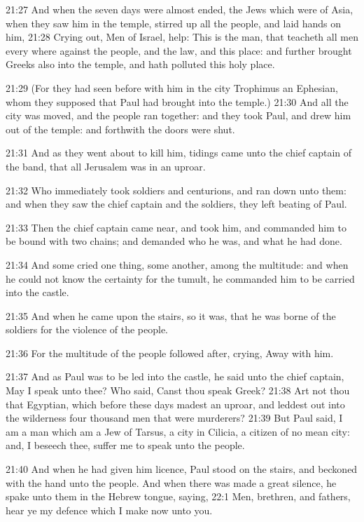 21:27 And when the seven days were almost ended, the Jews which were
of Asia, when they saw him in the temple, stirred up all the people,
and laid hands on him, 21:28 Crying out, Men of Israel, help: This is
the man, that teacheth all men every where against the people, and the
law, and this place: and further brought Greeks also into the temple,
and hath polluted this holy place.

21:29 (For they had seen before with him in the city Trophimus an
Ephesian, whom they supposed that Paul had brought into the temple.)
21:30 And all the city was moved, and the people ran together: and
they took Paul, and drew him out of the temple: and forthwith the
doors were shut.

21:31 And as they went about to kill him, tidings came unto the chief
captain of the band, that all Jerusalem was in an uproar.

21:32 Who immediately took soldiers and centurions, and ran down unto
them: and when they saw the chief captain and the soldiers, they left
beating of Paul.

21:33 Then the chief captain came near, and took him, and commanded
him to be bound with two chains; and demanded who he was, and what he
had done.

21:34 And some cried one thing, some another, among the multitude: and
when he could not know the certainty for the tumult, he commanded him
to be carried into the castle.

21:35 And when he came upon the stairs, so it was, that he was borne
of the soldiers for the violence of the people.

21:36 For the multitude of the people followed after, crying, Away
with him.

21:37 And as Paul was to be led into the castle, he said unto the
chief captain, May I speak unto thee? Who said, Canst thou speak
Greek?  21:38 Art not thou that Egyptian, which before these days
madest an uproar, and leddest out into the wilderness four thousand
men that were murderers?  21:39 But Paul said, I am a man which am a
Jew of Tarsus, a city in Cilicia, a citizen of no mean city: and, I
beseech thee, suffer me to speak unto the people.

21:40 And when he had given him licence, Paul stood on the stairs, and
beckoned with the hand unto the people. And when there was made a
great silence, he spake unto them in the Hebrew tongue, saying, 22:1
Men, brethren, and fathers, hear ye my defence which I make now unto
you.

